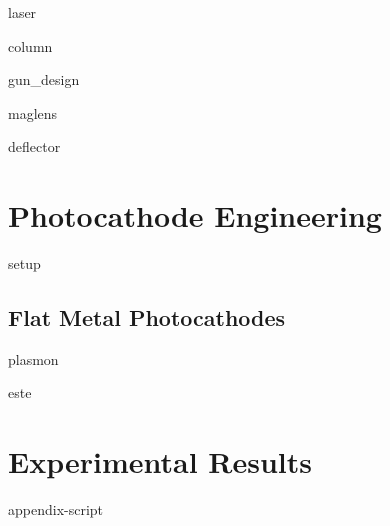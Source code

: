\documentclass{uicthesi}
\begin{document}
  {laser}

  {column}

  {gun_design}

  {maglens}

  {deflector}

\chapter{Photocathode Engineering}

  {setup}

\section{Flat Metal Photocathodes}

  {plasmon}

  {este}

\chapter{Experimental Results}

\appendix
  {appendix-script}

\newpage


\end{document}
